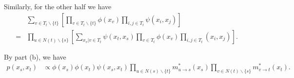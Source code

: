 \documentclass{article}
\newcommand{\qeds}{\hfill\qedsymbol}
\begin{document}
Similarly, for the other half we have
\begin{align*}
	&\sum_{v\in T_t\backslash\{t\}}\left[\prod_{v\in T_t\backslash\{t\}}\phi(x_v)\prod_{i, j \in T_t}
	\psi(x_i,x_j)\right]\\
	=& \prod_{u\in N(t)\backslash\{s\}}\left[\sum_{x_v|v\in T_t}\psi(x_t, x_s)\prod_{v\in T_t}\phi(x_v)\prod_{i,j\in T_t}(x_i, x_j)\right].
\end{align*}

By part (b), we have
\begin{align*}
	p(x_s, x_t) &\propto \phi(x_s)\phi(x_t)\psi(x_s, x_t) \prod_{u\in N(s)\backslash\{t\}}m^*_{u\to s}(x_s) \prod_{v\in N(t)\backslash\{s\}}m^*_{v\to t}(x_t).
\end{align*}\qeds
\end{document}
